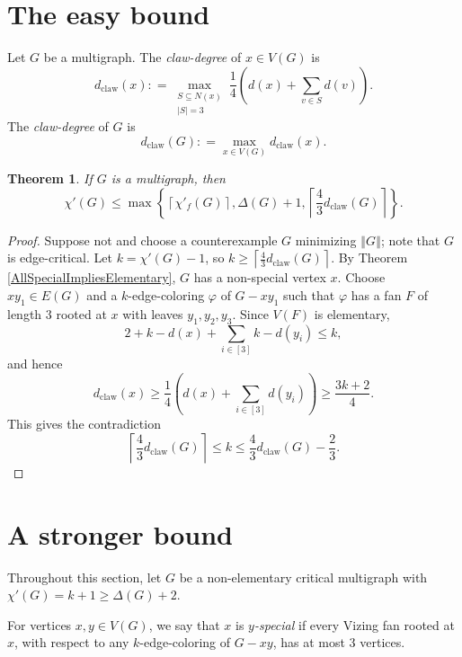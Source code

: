 \documentclass[12pt]{amsart}
\theoremstyle{plain}
\newtheorem{thm}{Theorem}
\theoremstyle{definition}
\theoremstyle{remark}
\newcommand{\set}[1]{\left\{ #1 \right\}}
\newcommand{\card}[1]{\left|#1\right|}
\newcommand{\size}[1]{\left\Vert#1\right\Vert}
\newcommand{\ceil}[1]{\left\lceil#1\right\rceil}
\newcommand{\irange}[1]{\left[#1\right]}
\newcommand{\parens}[1]{\left( #1 \right)}
\newcommand{\DefinedAs}{\mathrel{\mathop:}=}
\newcommand{\dclaw}[1]{d_{\text{claw}}\left( #1 \right)}
\newcommand{\vph}{\varphi}
\begin{document}
\section{The easy bound}
Let $G$ be a multigraph.  The \emph{claw-degree} of $x \in V(G)$ is 
\[\dclaw{x} \DefinedAs \max_{\substack{S \subseteq N(x) \\ \card{S} = 3}}\frac14 \parens{d(x) + \sum_{v \in S} d(v)}.\]
The \emph{claw-degree} of $G$ is 
\[\dclaw{G} \DefinedAs \max_{x \in V(G)} \dclaw{x}.\]
\begin{thm}\label{EasyBound}
If $G$ is a multigraph, then
\[\chi'(G) \le \max\set{\ceil{\chi'_f(G)}, \Delta(G) + 1, \ceil{\frac43\dclaw{G}}}.\]
\end{thm}
\begin{proof}
Suppose not and choose a counterexample $G$ minimizing $\size{G}$; note that $G$ is
edge-critical. Let $k=\chi'(G)-1$, so $k \ge \ceil{\frac43\dclaw{G}}$. 
By Theorem \ref{AllSpecialImpliesElementary}, $G$ has a non-special vertex $x$.
Choose $xy_1 \in E(G)$ and a $k$-edge-coloring $\vph$ of $G - xy_1$ such that
$\vph$ has a fan $F$ of length $3$ rooted at $x$ with leaves $y_1, y_2, y_3$.  
Since $V(F)$ is elementary, 
\[2 + k - d(x) + \sum_{i \in \irange{3}} k-d(y_i) \le k,\]
and hence
\[\dclaw{x} \ge \frac14\parens{d(x) + \sum_{i \in \irange{3}} d(y_i)} \ge \frac{3k+2}{4}.\]
This gives the contradiction
\[\ceil{\frac43\dclaw{G}} \le k \le \frac43\dclaw{G} - \frac23.\]
\end{proof}

\section{A stronger bound}
Throughout this section, let $G$ be a non-elementary critical multigraph with $\chi'(G) = k + 1 \ge \Delta(G) + 2$.

For vertices $x,y \in V(G)$, we say that $x$ is \emph{$y$-special} if every Vizing fan rooted at $x$, with respect to any $k$-edge-coloring of $G-xy$, has at most 3 vertices.
\end{document}
